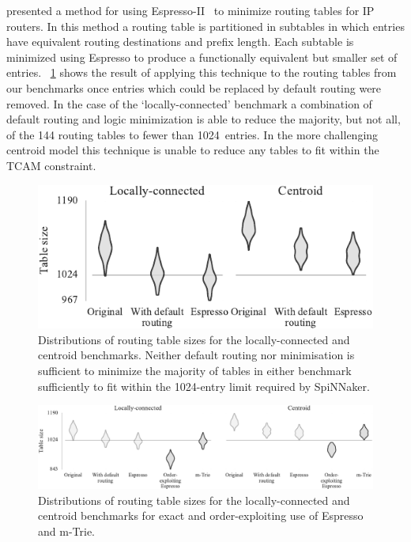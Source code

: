\documentclass[conference]{IEEEtran}
\begin{document}
\textcite{Liu2002} presented a method for using Espresso-II~\parencite{Brayton1984} to minimize routing tables for IP routers.
In this method a routing table is partitioned in subtables in which entries have equivalent routing destinations and prefix length.
Each subtable is minimized using Espresso to produce a functionally equivalent but smaller set of entries.
\figurename~\ref{fig:results/espresso_no_dc} shows the result of applying this technique to the routing tables from our benchmarks once entries which could be replaced by default routing were removed.
In the case of the `locally-connected' benchmark a combination of default routing and logic minimization is able to reduce the majority, but not all, of the 144 routing tables to fewer than \num{1024}~entries.
In the more challenging centroid model this technique is unable to reduce any tables to fit within the TCAM constraint.

\begin{figure}
  \centering
  \includegraphics{experiments/results_no_dc}
  \caption{
    Distributions of routing table sizes for the locally-connected and centroid benchmarks.
    Neither default routing nor minimisation is sufficient to minimize the majority of tables in either benchmark sufficiently to fit within the 1024-entry limit required by SpiNNaker.}
  \label{fig:results/espresso_no_dc}
\end{figure}

\begin{figure}[!t]
  \centering
  \includegraphics{experiments/results_with_esp_dc_and_mtrie}
  \caption{
    Distributions of routing table sizes for the locally-connected and centroid benchmarks for exact and order-exploiting use of Espresso and m-Trie.
  }
  \label{fig:results/espresso_with_dc_and_mtrie}
\end{figure}
\end{document}

